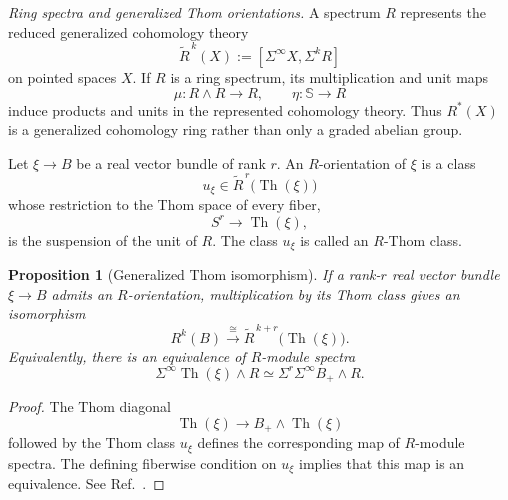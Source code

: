 \documentclass[aps,prx,reprint,superscriptaddress,twocolumn,amsmath,amssymb,amsfonts, nofootinbib]{revtex4-2}
\theoremstyle{apsstyle}
\newtheorem{proposition}[theorem]{Proposition}
\begin{document}
\bigskip

\noindent\textit{Ring spectra and generalized Thom orientations.}
A spectrum $R$ represents the reduced generalized cohomology theory
\begin{equation}
    \widetilde R^{\,k}(X)
    := [\Sigma^\infty X,
        \Sigma^kR]
    \label{eq:ring_spectrum_represented_cohomology}
\end{equation}
on pointed spaces $X$. If $R$ is a ring spectrum, its multiplication
and unit maps
\begin{equation*}
    \mu:
    R\wedge R\longrightarrow R,
    \qquad
    \eta:
    \mathbb S\longrightarrow R
\end{equation*}
induce products and units in the represented cohomology theory. Thus
$R^*(X)$ is a generalized cohomology ring rather than only a graded
abelian group.

Let $\xi\to B$ be a real vector bundle of rank $r$. An
$R$-orientation of $\xi$ is a class
\begin{equation}
    u_{\xi}
    \in
    \widetilde R^{\,r}
    \bigl(\operatorname{Th}(\xi)\bigr)
    \label{eq:R_Thom_class}
\end{equation}
whose restriction to the Thom space of every fiber,
\begin{equation*}
    S^r
    \longrightarrow
    \operatorname{Th}(\xi),
\end{equation*}
is the suspension of the unit of $R$. The class $u_{\xi}$ is called an
$R$-Thom class.

\bigskip 

\begin{proposition}[Generalized Thom isomorphism]
\label{prop:generalized_Thom_isomorphism}
If a rank-$r$ real vector bundle $\xi\to B$ admits an $R$-orientation,
multiplication by its Thom class gives an isomorphism
\begin{equation}
    R^k(B)
    \xrightarrow{\;\cong\;}
    \widetilde R^{\,k+r}
    \bigl(\operatorname{Th}(\xi)\bigr).
    \label{eq:generalized_Thom_isomorphism}
\end{equation}
Equivalently, there is an equivalence of $R$-module spectra
\begin{equation}
    \Sigma^\infty\operatorname{Th}(\xi)\wedge R
    \simeq
    \Sigma^r\Sigma^\infty B_+\wedge R.
    \label{eq:spectrum_level_Thom_isomorphism}
\end{equation}
\end{proposition}

\begin{proof}
The Thom diagonal
\begin{equation*}
    \operatorname{Th}(\xi)
    \longrightarrow
    B_+\wedge\operatorname{Th}(\xi)
\end{equation*}
followed by the Thom class $u_\xi$ defines the corresponding map of
$R$-module spectra. The defining fiberwise condition on $u_\xi$
implies that this map is an equivalence. See
Ref.~\cite[Prop.~2.18]{ABGHR}.
\end{proof}
\end{document}
